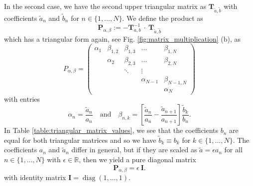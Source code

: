 In the second case, we have the second upper triangular matrix as $\mathbf{T}_{\tilde{a},\tilde{b}}$ with coefficients $\tilde{a}_{n}$ and $\tilde{b}_{n}$ for $n\in\{1,\ldots,N\}$. We define the product as 
\begin{equation}
	\mathbf{P}_{\alpha,\beta} := - \mathbf{T}_{a,b}^{-1} ~ \cdot ~ \mathbf{T}_{\tilde{a},\tilde{b}}
\end{equation}
which has a triangular form again, see Fig. \ref{fig:matrix_multiplication} (b), as
\begin{equation}
	P_{\alpha,\beta} = 
	\begin{pmatrix}
		\alpha_{1} & \beta_{1,2} &  \beta_{1,3} & \ldots &   \beta_{1,N} \\
		& \alpha_{2} & \beta_{2,3} &  \ldots &  \beta_{2,N} \\
		& & \ddots & \vdots \\
		& & & \alpha_{N-1} & \beta_{N-1,N} \\
		& & & & \alpha_{N}
	\end{pmatrix}
\end{equation}
with entries
\begin{equation}
	\alpha_{n} = \frac{\tilde{a}_{n}}{a_{n}} \quad \text{and} \quad \beta_{n,k} = \left[\frac{\tilde{a}_{n}}{a_{n}} - \frac{\tilde{a}_{n+1}}{a_{n+1}} \right] \frac{\tilde{b}_{k}}{b_{n}} \text{.}
\end{equation} 
In Table \ref{table:triangular_matrix_values}, we see that the coefficients $b_{n}$ are equal for both triangular matrices and so we have $\tilde{b}_{k} \equiv b_{k}$ for $k \in \{1,\ldots,N\}$. The coefficients $a_{n}$ and $\tilde{a}_{n}$ differ in general, but if they are scaled as  $\tilde{a} = \epsilon a_{n}$ for all $n \in \{1,\ldots,N\}$ with $\epsilon \in \mathbb{R}$, then we yield a pure diagonal matrix
\begin{equation*}
	\mathbf{P}_{\alpha,\beta} = \epsilon~\mathbf{I} \text{.}
\end{equation*}
with identity matrix $\mathbf{I} =\operatorname{diag}(1,\ldots,1)$.

